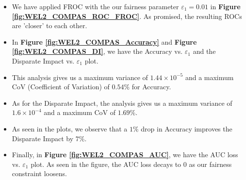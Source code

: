 \documentclass{article}
\begin{document}
\begin{itemize}
    \item We have applied FROC with the our fairness parameter $\varepsilon_1 = 0.01$ in \textbf{Figure \ref{fig:WEL2_COMPAS_ROC_FROC}}. As promised, the resulting ROCs are 'closer' to each other.
    \item In \textbf{Figure \ref{fig:WEL2_COMPAS_Accuracy}} and \textbf{Figure \ref{fig:WEL2_COMPAS_DI}}, we have the Accuracy vs. $\varepsilon_1$ and the Disparate Impact vs. $\varepsilon_1$ plot.
    \item This analysis gives us a maximum variance of $1.44\times10^{-5}$ and a maximum CoV (Coefficient of Variation) of $0.54\%$ for Accuracy.
    \item As for the Disparate Impact, the analysis gives us a maximum variance of $1.6\times10^{-4}$ and a maximum CoV of $1.69\%$.
    \item As seen in the plots, we observe that a $1\%$ drop in Accuracy improves the Disparate Impact by $7\%$.
    \item Finally, in \textbf{Figure \ref{fig:WEL2_COMPAS_AUC}}, we have the AUC loss vs. $\varepsilon_1$ plot. As seen in the figure, the AUC loss decays to $0$ as our fairness constraint loosens.
\end{itemize}



        
\end{document}
